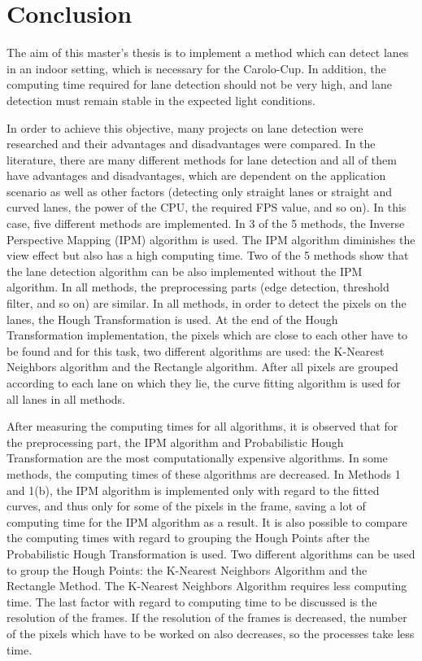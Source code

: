 %
\chapter{Conclusion}\label{cha:Conclusion}
%

The aim of this master's thesis is to implement a method which can detect lanes in an indoor setting, which is necessary for the Carolo-Cup. In addition, the computing time required for lane detection should not be very high, and lane detection must remain stable in the expected light conditions.

In order to achieve this objective, many projects on lane detection were researched and their advantages and disadvantages were compared. In the literature, there are many different methods for lane detection and all of them have advantages and disadvantages, which are dependent on the application scenario as well as other factors (detecting only straight lanes or straight and curved lanes, the power of the CPU, the required FPS value, and so on). In this case, five different methods are implemented. In 3 of the 5 methods, the Inverse Perspective Mapping (IPM) algorithm is used. The IPM algorithm diminishes the view effect but also has a high computing time. Two of the 5 methods show that the lane detection algorithm can be also implemented without the IPM algorithm. In all methods, the preprocessing parts (edge detection, threshold filter, and so on) are similar. In all methods, in order to detect the pixels on the lanes, the Hough Transformation is used. At the end of the Hough Transformation implementation, the pixels which are close to each other have to be found and for this task, two different algorithms are used: the K-Nearest Neighbors algorithm and the Rectangle algorithm. After all pixels are grouped according to each lane on which they lie, the curve fitting algorithm is used for all lanes in all methods.

After measuring the computing times for all algorithms, it is observed that for the preprocessing part, the IPM algorithm and Probabilistic Hough Transformation are the most computationally expensive algorithms. In some methods, the computing times of these algorithms are decreased. In Methods 1 and 1(b), the IPM algorithm is implemented only with regard to the fitted curves, and thus only for some of the pixels in the frame, saving a lot of computing time for the IPM algorithm as a result. It is also possible to compare the computing times with regard to grouping the Hough Points after the Probabilistic Hough Transformation is used. Two different algorithms can be used to group the Hough Points: the K-Nearest Neighbors Algorithm and the Rectangle Method. The K-Nearest Neighbors Algorithm requires less computing time. The last factor with regard to computing time to be discussed is the resolution of the frames. If the resolution of the frames is decreased, the number of the pixels which have to be worked on also decreases, so the processes take less time.

